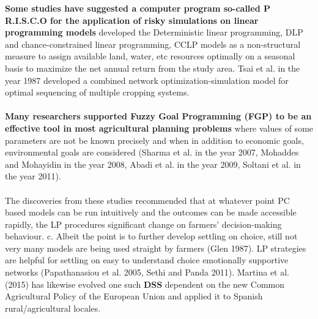 \documentclass[conference]{IEEEtran}
\begin{document}
\textbf{Some studies have suggested a computer program so-called P R.I.S.C.O for the application of risky simulations on linear programming models} developed the Deterministic linear programming, DLP and chance-constrained linear programming, CCLP models as a non-structural measure to assign available land, water, etc resources optimally on a seasonal basis to maximize the net annual return from the study area. Tsai et al. in the year 1987 developed a combined network optimization-simulation model for optimal sequencing of multiple cropping systems.
\\\\
\textbf{Many researchers supported Fuzzy Goal Programming (FGP) to be an effective tool in most agricultural planning problems} where values of some parameters are not be known precisely and when in addition to economic goals, environmental goals are considered (Sharma et al. in the year 2007, Mohaddes and Mohayidin in the year 2008, Abadi et al. in the year 2009, Soltani et al. in the year 2011).
\\\\
The discoveries from these studies recommended that at whatever point PC based models can be run intuitively and the outcomes can be made accessible rapidly, the LP procedures significant change on farmers' decision-making behaviour.  c. Albeit the point is to further develop settling on choice, still not very many models are being used straight by farmers (Glen 1987). LP strategies are helpful for settling on easy to understand choice emotionally supportive networks (Papathanasiou et al. 2005, Sethi and Panda 2011). Martina et al. (2015) has likewise evolved one such \textbf{DSS} dependent on the new Common Agricultural Policy of the European Union and applied it to Spanish rural/agricultural locales.
\end{document}
